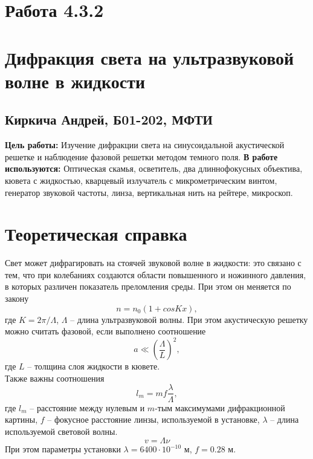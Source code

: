 \documentclass[a4paper,12pt]{article}
\newcommand{\n}{\hfill \break}
\begin{document}
\section*{Работа 4.3.2}	
\section*{Дифракция света на ультразвуковой волне в жидкости}
\subsection*{Киркича Андрей, Б01-202, МФТИ}
\n\n
\textbf{Цель работы: }
Изучение дифракции света на синусоидальной акустической решетке и наблюдение фазовой решетки методом темного поля.
	\n\n
	\textbf{В работе используются: }
Оптическая скамья, осветитель, два длиннофокусных объектива, кювета с жидкостью, кварцевый излучатель с микрометрическим винтом, генератор звуковой частоты, линза, вертикальная нить на рейтере, микроскоп.
\n\n


\section*{Теоретическая справка}
Свет может дифрагировать на стоячей звуковой волне в жидкости: это связано с тем, что при колебаниях создаются области повышенного и ножинного давления, в которых различен показатель преломления среды. При этом он меняется по закону
\begin{equation}
    n = n_0(1 + cos Kx),
\end{equation}
где $K = 2\pi/\Lambda$, $\Lambda$ -- длина ультразвуковой волны. При этом акустическую решетку можно считать фазовой, если выполнено соотношение 
\begin{equation}
    a \ll \left( \frac{\Lambda}{L} \right)^2,
\end{equation}
где $L$ -- толщина слоя жидкости в кювете. \\
\noindent
Также важны соотношения
\begin{equation}
    l_m = mf\frac{\lambda}{\Lambda},
\end{equation}
где $l_m$ -- расстояние между нулевым и $m$-тым максимумами дифракционной картины, $f$ -- фокусное расстояние линзы, используемой в установке, $\lambda$ -- длина используемой световой волны.
\begin{equation}
    v = \Lambda \nu
\end{equation}
При этом параметры установки $\lambda = 6400 \cdot 10^{-10}$ м, $f = 0.28$ м.
\end{document}
